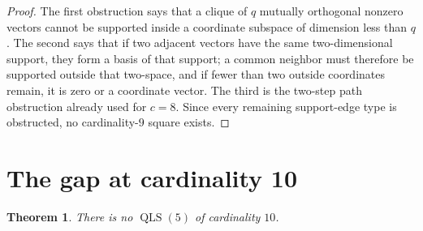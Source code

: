\documentclass[11pt]{article}
\newtheorem{theorem}{Theorem}
\newcommand{\QLS}{\operatorname{QLS}}
\begin{document}
\begin{proof}
The first obstruction says that a clique of \(q\) mutually orthogonal nonzero
vectors cannot be supported inside a coordinate subspace of dimension less
than \(q\).  The second says that if two adjacent vectors have the same
two-dimensional support, they form a basis of that support; a common neighbor
must therefore be supported outside that two-space, and if fewer than two
outside coordinates remain, it is zero or a coordinate vector.  The third is
the two-step path obstruction already used for \(c=8\).  Since every remaining
support-edge type is obstructed, no cardinality-\(9\) square exists.
\end{proof}

\section{The gap at cardinality 10}
\label{sec:c10}

\begin{theorem}
There is no \(\QLS(5)\) of cardinality \(10\).
\end{theorem}
\end{document}
